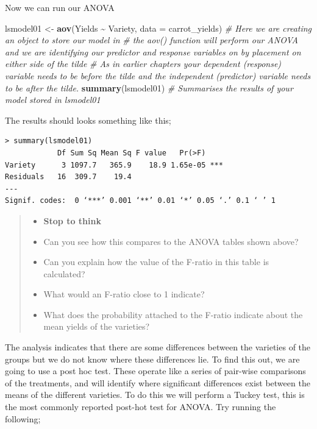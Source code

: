 \documentclass[
]{book}
\newenvironment{Shaded}{\begin{snugshade}}{\end{snugshade}}
\newcommand{\AttributeTok}[1]{\textcolor[rgb]{0.13,0.29,0.53}{#1}}
\newcommand{\CommentTok}[1]{\textcolor[rgb]{0.56,0.35,0.01}{\textit{#1}}}
\newcommand{\FunctionTok}[1]{\textcolor[rgb]{0.13,0.29,0.53}{\textbf{#1}}}
\newcommand{\NormalTok}[1]{#1}
\newcommand{\OtherTok}[1]{\textcolor[rgb]{0.56,0.35,0.01}{#1}}
\newcommand{\SpecialCharTok}[1]{\textcolor[rgb]{0.81,0.36,0.00}{\textbf{#1}}}
\providecommand{\tightlist}{%
  \setlength{\itemsep}{0pt}\setlength{\parskip}{0pt}}
\begin{document}
Now we can run our ANOVA

\begin{Shaded}
\begin{Highlighting}[]
\NormalTok{lsmodel01 }\OtherTok{\textless{}{-}} \FunctionTok{aov}\NormalTok{(Yields }\SpecialCharTok{\textasciitilde{}}\NormalTok{ Variety, }\AttributeTok{data =}\NormalTok{ carrot\_yields)}
\CommentTok{\# Here we are creating an object to store our model in }
\CommentTok{\# the aov() function will perform our ANOVA and we are identifying our predictor and response variables on by placement on either side of the tilde }
\CommentTok{\# As in earlier chapters your dependent (response) variable needs to be before the tilde and the independent (predictor) variable needs to be after the tilde.}
\FunctionTok{summary}\NormalTok{(lsmodel01)}
\CommentTok{\# Summarises the results of your model stored in lsmodel01}
\end{Highlighting}
\end{Shaded}

The results should looks something like this;

\begin{verbatim}
> summary(lsmodel01)
            Df Sum Sq Mean Sq F value   Pr(>F)    
Variety      3 1097.7   365.9    18.9 1.65e-05 ***
Residuals   16  309.7    19.4                     
---
Signif. codes:  0 ‘***’ 0.001 ‘**’ 0.01 ‘*’ 0.05 ‘.’ 0.1 ‘ ’ 1
\end{verbatim}

\begin{quote}
\begin{itemize}
\tightlist
\item
  \textbf{Stop to think}
\item
  Can you see how this compares to the ANOVA tables shown above?
\item
  Can you explain how the value of the F-ratio in this table is calculated?
\item
  What would an F-ratio close to 1 indicate?
\item
  What does the probability attached to the F-ratio indicate about the mean yields of the varieties?
\end{itemize}
\end{quote}

The analysis indicates that there are some differences between the varieties of the groups but we do not know where these differences lie. To find this out, we are going to use a post hoc test. These operate like a series of pair-wise comparisons of the treatments, and will identify where significant differences exist between the means of the different varieties. To do this we will perform a Tuckey test, this is the most commonly reported post-hot test for ANOVA. Try running the following;
\end{document}

